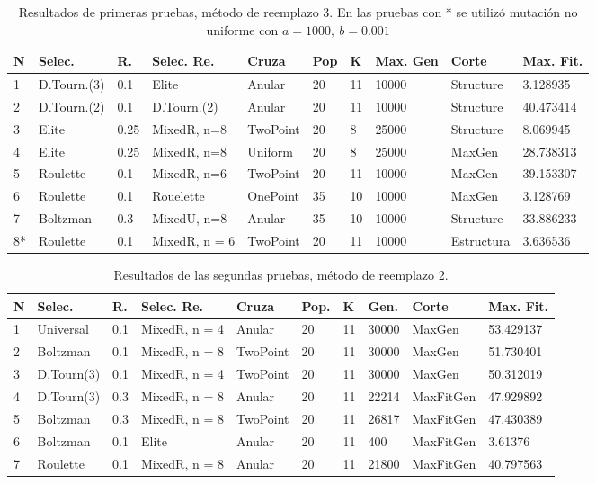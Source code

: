 \documentclass[11pt,a4paper]{article}
\begin{document}
\begin{table}[h]
\centering
\hspace*{-0.9cm}
\begin{tabular}{|l|l|l|l|l|l|l|l|l|l|}
\hline
N & Selec. & R. & Selec. Re. & Cruza & Pop & K & Max. Gen & Corte & Max. Fit. \\ \hline
1 & D.Tourn.(3) & 0.1 & Elite & Anular & 20 & 11 & 10000 & Structure & 3.128935 \\ \hline
2 & D.Tourn.(2) & 0.1 & D.Tourn.(2) & Anular & 20 & 11 & 10000 & Structure & 40.473414 \\ \hline
3 & Elite & 0.25 & MixedR, n=8 & TwoPoint & 20 & 8 & 25000 & Structure & 8.069945 \\ \hline
4 & Elite & 0.25 & MixedR, n=8 & Uniform & 20 & 8 & 25000 & MaxGen & 28.738313 \\ \hline
5 & Roulette & 0.1 & MixedR, n=6 & TwoPoint & 20 & 11 & 10000 & MaxGen & 39.153307 \\ \hline
6 & Roulette & 0.1 & Rouelette & OnePoint & 35 & 10 & 10000 & MaxGen & 3.128769 \\ \hline
7 & Boltzman & 0.3 & MixedU, n=8 & Anular & 35 & 10 & 10000 & Structure & 33.886233 \\ \hline
8* & Roulette & 0.1 & MixedR, n = 6 & TwoPoint & 20 & 11 & 10000 & Estructura & 3.636536 \\ \hline

\end{tabular}
\caption{Resultados de primeras pruebas, método de reemplazo 3. En las pruebas con * se utilizó mutación no uniforme con $a=1000, \ b =0.001$}
\label{table:prueba1-met3}
\end{table}

\begin{table}[h]
\centering
\hspace*{-0.9cm}
\begin{tabular}{|l|l|l|l|l|l|l|l|l|l|}
\hline
N & Selec. & R. & Selec. Re. & Cruza & Pop. & K & Gen. & Corte & Max. Fit. \\ \hline
1 & Universal & 0.1 & MixedR, n = 4 & Anular & 20 & 11 & 30000 & MaxGen & 53.429137 \\ \hline
2 & Boltzman & 0.1 & MixedR, n = 8 & TwoPoint & 20 & 11 & 30000 & MaxGen & 51.730401 \\ \hline
3 & D.Tourn(3) & 0.1 & MixedR, n = 4 & TwoPoint & 20 & 11 & 30000 & MaxGen & 50.312019 \\ \hline
4 & D.Tourn(3) & 0.3 & MixedR, n = 8 & Anular & 20 & 11 & 22214 & MaxFitGen & 47.929892 \\ \hline
5 & Boltzman & 0.3 & MixedR, n = 8 & TwoPoint & 20 & 11 & 26817 & MaxFitGen & 47.430389 \\ \hline
6 & Boltzman & 0.1 & Elite & Anular & 20 & 11 & 400 & MaxFitGen & 3.61376 \\ \hline
7 & Roulette & 0.1 & MixedR, n = 8 & Anular & 20 & 11 & 21800 & MaxFitGen & 40.797563 \\ \hline
\end{tabular}
\caption{Resultados de las segundas pruebas, método de reemplazo 2.}
\label{table:prueba2-met2}
\end{table}
\end{document}

